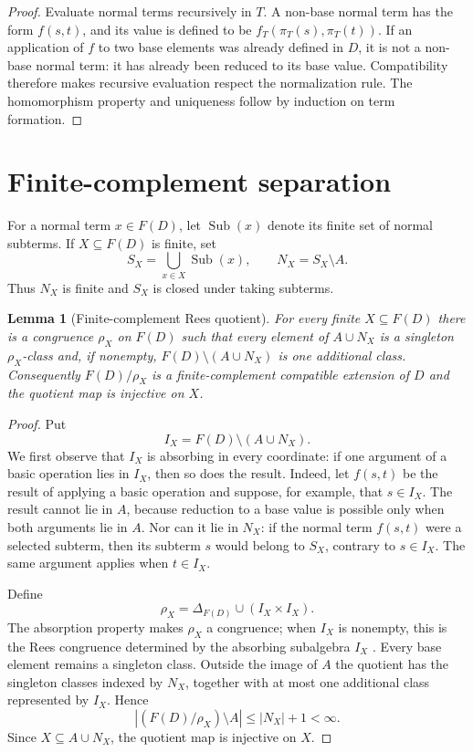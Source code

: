 \documentclass{birkau}
\newtheorem{lemma}[theorem]{Lemma}
\theoremstyle{definition}
\theoremstyle{remark}
\begin{document}
\begin{proof}
Evaluate normal terms recursively in $T$.  A non-base normal term has the form
$f(s,t)$, and its value is defined to be
$f_T(\pi_T(s),\pi_T(t))$.  If an application of $f$ to two base elements was
already defined in $D$, it is not a non-base normal term: it has already been
reduced to its base value.  Compatibility therefore makes recursive evaluation
respect the normalization rule.  The homomorphism property and uniqueness
follow by induction on term formation.
\end{proof}

\section{Finite-complement separation}\label{sec:finite-separation}

For a normal term $x\in F(D)$, let $\operatorname{Sub}(x)$ denote its finite
set of normal subterms.  If $X\subseteq F(D)$ is finite, set
\[
 S_X=\bigcup_{x\in X}\operatorname{Sub}(x),
 \qquad
 N_X=S_X\setminus A.
\]
Thus $N_X$ is finite and $S_X$ is closed under taking subterms.

\begin{lemma}[Finite-complement Rees quotient]
\label{lem:finite-complement-rees}
For every finite $X\subseteq F(D)$ there is a congruence $\rho_X$ on $F(D)$
such that every element of $A\cup N_X$ is a singleton $\rho_X$-class and, if
nonempty, $F(D)\setminus(A\cup N_X)$ is one additional class.  Consequently
$F(D)/\rho_X$ is a finite-complement compatible extension of $D$ and the
quotient map is injective on $X$.
\end{lemma}

\begin{proof}
Put
\[
 I_X=F(D)\setminus(A\cup N_X).
\]
We first observe that $I_X$ is absorbing in every coordinate: if one argument
of a basic operation lies in $I_X$, then so does the result.  Indeed, let
$f(s,t)$ be the result of applying a basic operation and suppose, for example,
that $s\in I_X$.  The result cannot lie in $A$, because reduction to a base
value is possible only when both arguments lie in $A$.  Nor can it lie in
$N_X$: if the normal term $f(s,t)$ were a selected subterm, then its subterm
$s$ would belong to $S_X$, contrary to $s\in I_X$.  The same argument applies
when $t\in I_X$.

Define
\[
 \rho_X=\Delta_{F(D)}\cup(I_X\times I_X).
\]
The absorption property makes $\rho_X$ a congruence; when $I_X$ is nonempty,
this is the Rees congruence determined by the absorbing subalgebra $I_X$
\cite{Tichy1981}.  Every base element remains a singleton class.  Outside the
image of $A$ the quotient has the singleton classes indexed by $N_X$, together
with at most one additional class represented by $I_X$.  Hence
\[
 |(F(D)/\rho_X)\setminus A|\le |N_X|+1<\infty.
\]
Since $X\subseteq A\cup N_X$, the quotient map is injective on $X$.
\end{proof}
\end{document}
